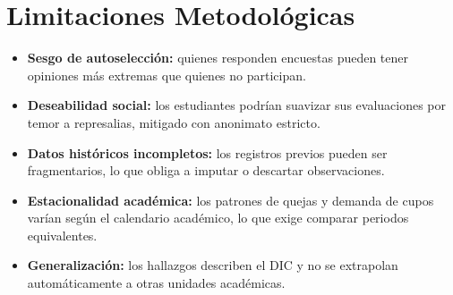 \section{Limitaciones Metodológicas}

\begin{itemize}[leftmargin=1.4cm, itemsep=3pt]
  \item \textbf{Sesgo de autoselección:} quienes responden encuestas pueden tener
        opiniones más extremas que quienes no participan.
  \item \textbf{Deseabilidad social:} los estudiantes podrían suavizar sus
        evaluaciones por temor a represalias, mitigado con anonimato estricto.
  \item \textbf{Datos históricos incompletos:} los registros previos pueden ser
        fragmentarios, lo que obliga a imputar o descartar observaciones.
  \item \textbf{Estacionalidad académica:} los patrones de quejas y demanda de
        cupos varían según el calendario académico, lo que exige comparar
        periodos equivalentes.
  \item \textbf{Generalización:} los hallazgos describen el \ac{DIC} y no se
        extrapolan automáticamente a otras unidades académicas.
\end{itemize}

